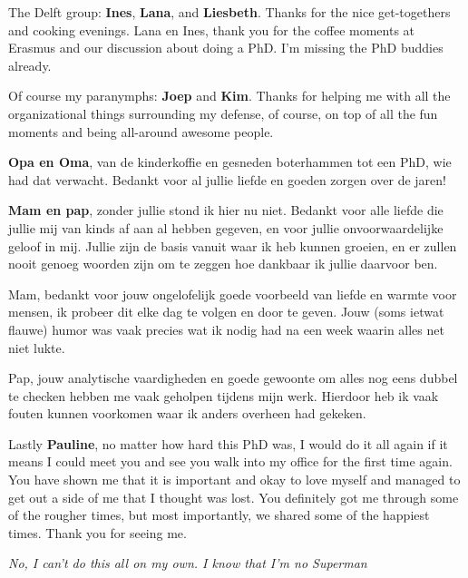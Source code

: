 The Delft group: \textbf{Ines}, \textbf{Lana}, and \textbf{Liesbeth}.
Thanks for the nice get-togethers and cooking evenings.
Lana en Ines, thank you for the coffee moments at Erasmus and our discussion about doing a PhD. I'm missing the PhD buddies already.

Of course my paranymphs: \textbf{Joep} and \textbf{Kim}.
Thanks for helping me with all the organizational things surrounding my defense, of course, on top of all the fun moments and being all-around awesome people.

\textbf{Opa en Oma}, van de kinderkoffie en gesneden boterhammen tot een PhD, wie had dat verwacht.
Bedankt voor al jullie liefde en goeden zorgen over de jaren!

\textbf{Mam en pap}, zonder jullie stond ik hier nu niet.
Bedankt voor alle liefde die jullie mij van kinds af aan al hebben gegeven, en voor jullie onvoorwaardelijke geloof in mij.
Jullie zijn de basis vanuit waar ik heb kunnen groeien, en er zullen nooit genoeg woorden zijn om te zeggen hoe dankbaar ik jullie daarvoor ben.

Mam, bedankt voor jouw ongelofelijk goede voorbeeld van liefde en warmte voor mensen, ik probeer dit elke dag te volgen en door te geven.
Jouw (soms ietwat flauwe) humor was vaak precies wat ik nodig had na een week waarin alles net niet lukte.

Pap, jouw analytische vaardigheden en goede gewoonte om alles nog eens dubbel te checken hebben me vaak geholpen tijdens mijn werk.
Hierdoor heb ik vaak fouten kunnen voorkomen waar ik anders overheen had gekeken.

Lastly \textbf{Pauline}, no matter how hard this PhD was, I would do it all again if it means I could meet you and see you walk into my office for the first time again.
You have shown me that it is important and okay to love myself and managed to get out a side of me that I thought was lost.
You definitely got me through some of the rougher times, but most importantly, we shared some of the happiest times.
Thank you for seeing me.

\vspace*{10em}


\hfill \textit{No, I can't do this all on my own. I know that I'm no Superman} \hfill
